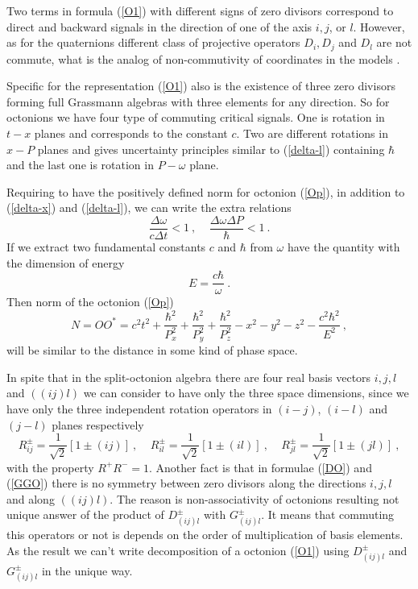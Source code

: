 \documentclass[a4paper,12pt]{article}
\begin{document}
Two terms in formula (\ref{O1}) with different signs of zero divisors correspond to direct 
and backward signals in the direction of one of the axis $i, j$, or $l$. However, as for 
the quaternions different class of projective operators $D_i, D_j$ and $D_l$ are not 
commute, what is the analog of non-commutivity of coordinates in the models \cite{Non}.

Specific for the representation (\ref{O1}) also is the existence of three zero divisors 
forming full Grassmann algebras with three elements for any direction. So for octonions 
we have four type of commuting critical signals. One is rotation in $t-x$ planes and 
corresponds to the constant $c$. Two are different rotations in $x-P$ planes and gives 
uncertainty principles similar to (\ref{delta-l}) containing $\hbar$ and the last one is 
rotation in $P-\omega$ plane. 

Requiring to have the positively defined norm for octonion (\ref{Op}), in addition to 
(\ref{delta-x}) and (\ref{delta-l}), we can write the extra relations 
\begin{equation} \label{delta-e}
\frac{\Delta\omega}{c\Delta t} < 1 ~, ~~~~~ \frac{\Delta\omega\Delta P}{\hbar} < 1 ~.
\end{equation}
If we extract two fundamental constants $c$ and $\hbar$ from $\omega$ have the quantity 
with the dimension of energy
\begin{equation}\label{E}
E = \frac{c\hbar}{\omega} ~.
\end{equation}
Then norm of the octonion (\ref{Op}) 
\begin{equation} \label{ON}
N = OO^* = c^2t^2 + \frac{\hbar^2}{P_x^2}+ \frac{\hbar^2}{P_y^2} + \frac{\hbar^2}{P_z^2} 
- x^2 - y^2 - z^2 - \frac{c^2\hbar^2}{E^2} ~,
\end{equation}
will be similar to the distance in some kind of phase space.

In spite that in the split-octonion algebra there are four real basis vectors $i, j, l$ 
and $((ij)l)$ we can consider to have only the three space dimensions, since we have only 
the three independent rotation operators in $(i-j)$, $(i-l)$ and $(j-l)$ planes respectively
\begin{equation} \label{RO}
R^\pm_{ij} = \frac{1}{\sqrt{2}}[1 \pm (ij)] ~, ~~~~~ R^\pm_{il} = 
\frac{1}{\sqrt{2}}[1 \pm (il)]~, ~~~~~ R^\pm_{jl} = \frac{1}{\sqrt{2}}[1 \pm (jl)]~,
\end{equation} 
with the property $R^+R^- = 1$. Another fact is that in formulae (\ref{DO}) and 
(\ref{GGO}) there is no symmetry between zero divisors along the directions $i, j, l$ 
and along $((ij)l)$. The reason is non-associativity of octonions resulting not unique 
answer of the product of $D^\pm_{(ij)l} $ with $G^\pm_{(ij)l} $. It means that commuting 
this operators or not is depends on the order of multiplication of basis elements. As the 
result we can't write decomposition of a octonion (\ref{O1}) using $D^\pm_{(ij)l} $ and 
$G^\pm_{(ij)l} $ in the unique way. 
\end{document}
